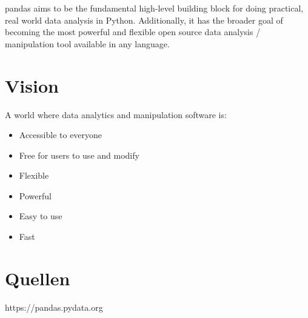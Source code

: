 \documentclass[a4paper, 11pt]{article}
\begin{document}
pandas aims to be the fundamental high-level building block for doing practical, real world data analysis in Python. Additionally, it has the broader goal of becoming the most powerful and flexible open source data analysis / manipulation tool available in any language.

\section{Vision}

A world where data analytics and manipulation software is:

\begin{itemize}
\item Accessible to everyone
\item Free for users to use and modify
\item Flexible
\item Powerful
\item Easy to use
\item Fast
\end{itemize}

\section{Quellen}

https://pandas.pydata.org
\end{document}
